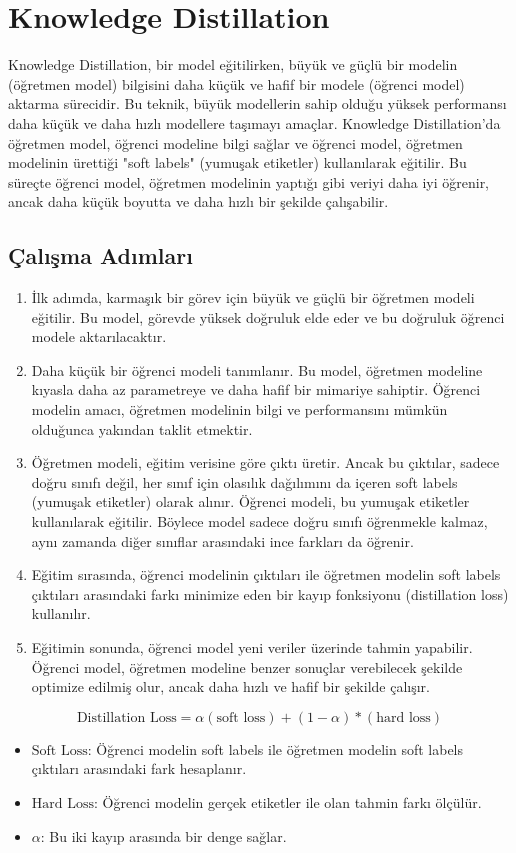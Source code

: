 \section{Knowledge Distillation}

Knowledge Distillation, bir model eğitilirken, büyük ve güçlü bir modelin (öğretmen model) bilgisini daha küçük ve hafif bir modele (öğrenci model) aktarma sürecidir. Bu teknik, büyük modellerin sahip olduğu yüksek performansı daha küçük ve daha hızlı modellere taşımayı amaçlar. Knowledge Distillation'da öğretmen model, öğrenci modeline bilgi sağlar ve öğrenci model, öğretmen modelinin ürettiği "soft labels" (yumuşak etiketler) kullanılarak eğitilir. Bu süreçte öğrenci model, öğretmen modelinin yaptığı gibi veriyi daha iyi öğrenir, ancak daha küçük boyutta ve daha hızlı bir şekilde çalışabilir. 

\subsection{Çalışma Adımları}

\begin{enumerate}
    \item İlk adımda, karmaşık bir görev için büyük ve güçlü bir öğretmen modeli eğitilir. Bu model, görevde yüksek doğruluk elde eder ve bu doğruluk öğrenci modele aktarılacaktır.
    \item Daha küçük bir öğrenci modeli tanımlanır. Bu model, öğretmen modeline kıyasla daha az parametreye ve daha hafif bir mimariye sahiptir. Öğrenci modelin amacı, öğretmen modelinin bilgi ve performansını mümkün olduğunca yakından taklit etmektir.
    \item Öğretmen modeli, eğitim verisine göre çıktı üretir. Ancak bu çıktılar, sadece doğru sınıfı değil, her sınıf için olasılık dağılımını da içeren soft labels (yumuşak etiketler) olarak alınır. Öğrenci modeli, bu yumuşak etiketler kullanılarak eğitilir. Böylece model sadece doğru sınıfı öğrenmekle kalmaz, aynı zamanda diğer sınıflar arasındaki ince farkları da öğrenir.
    \item Eğitim sırasında, öğrenci modelinin çıktıları ile öğretmen modelin soft labels çıktıları arasındaki farkı minimize eden bir kayıp fonksiyonu (distillation loss) kullanılır.
    \item Eğitimin sonunda, öğrenci model yeni veriler üzerinde tahmin yapabilir. Öğrenci model, öğretmen modeline benzer sonuçlar verebilecek şekilde optimize edilmiş olur, ancak daha hızlı ve hafif bir şekilde çalışır.
\end{enumerate}

\[ \text{Distillation Loss} = \alpha (\text{soft loss}) + (1 - \alpha) * (\text{hard loss})\]

\begin{itemize}
    \item $\text{Soft Loss}$: Öğrenci modelin soft labels ile öğretmen modelin soft labels çıktıları arasındaki fark hesaplanır.
    \item $\text{Hard Loss}$: Öğrenci modelin gerçek etiketler ile olan tahmin farkı ölçülür.
    \item $\alpha$: Bu iki kayıp arasında bir denge sağlar.
\end{itemize}


\newpage